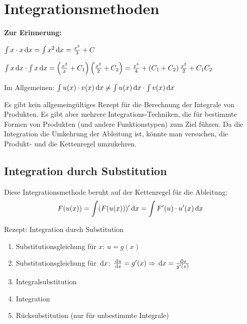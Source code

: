 \section{Integrationsmethoden}\label{sec:integrationsmethoden}

\textbf{Zur Erinnerung:}

$\int x \cdot x \,\mathrm{d}x = \int x^2 \,\mathrm{d}x = \frac{x^3}{3} + C$

$\int x \,\mathrm{d}x \cdot \int x \,\mathrm{d}x = \left( \frac{x^2}{x} + C_1 \right) \left( \frac{x^2}{2} + C_2 \right) = \frac{x^4}{4} + \left( C_1 + C_2 \right) \frac{x^2}{2} + C_1 C_2$

Im Allgemeinen: $\int u(x) \cdot v(x) \,\mathrm{d}x \neq \int u(x) \,\mathrm{d}x \cdot \int v(x) \,\mathrm{d}x$

Es gibt kein allgemeingültiges Rezept für die Berechnung der Integrale von Produkten.
Es gibt aber mehrere Integrations-Techniken, die für bestimmte Formen von Produkten (und andere Funktionstypen) zum Ziel führen.
Da die Integration die Umkehrung der Ableitung ist, könnte man versuchen, die Produkt- und die Kettenregel umzukehren.

\subsection{Integration durch Substitution}\label{subsec:integration-durch-substitution}

Diese Integrationsmethode beruht auf der Kettenregel für die Ableitung: \[F(u(x)) = \int (F(u(x)))' \,\mathrm{d}x = \int F'(u) \cdot u'(x) \,\mathrm{d}x\]

\begin{definition}{Rezept: Integration durch Substitution}
    \begin{enumerate}
        \item Substitutionsgleichung für $x$: $u = g(x)$
        \item Substitutionsgleichung für $\,\mathrm{d}x$: $\frac{\,\mathrm{d}u}{\,\mathrm{d}x} = g'(x) \Rightarrow \,\mathrm{d}x = \frac{\,\mathrm{d}u}{g'(x)}$
        \item Integralsubstitution
        \item Integration
        \item Rücksubstitution (nur für unbestimmte Integrale)
    \end{enumerate}
\end{definition}

